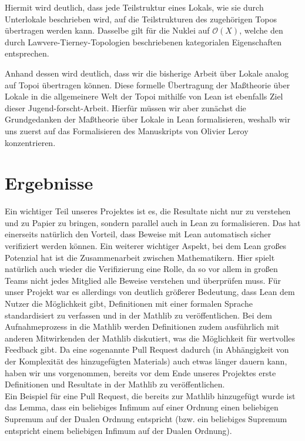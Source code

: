\documentclass{article}
\begin{document}
Hiermit wird deutlich, dass jede Teilstruktur eines Lokals, wie sie durch Unterlokale beschrieben wird, auf die Teilstrukturen des zugehörigen Topos übertragen werden kann. Dasselbe gilt für die Nuklei auf $\mathcal{O}(X)$, welche den durch Lawvere-Tierney-Topologien beschriebenen kategorialen Eigenschaften entsprechen.

Anhand dessen wird deutlich, dass wir die bisherige Arbeit über Lokale analog auf Topoi übertragen können. Diese formelle Übertragung der Maßtheorie über Lokale in die allgemeinere Welt der Topoi mithilfe von Lean ist ebenfalls Ziel dieser Jugend-forscht-Arbeit. Hierfür müssen wir aber zunächst die Grundgedanken der Maßtheorie über Lokale in Lean formalisieren, weshalb wir uns zuerst auf das Formalisieren des Manuskripts von Olivier Leroy konzentrieren.   

\section{Ergebnisse}
Ein wichtiger Teil unseres Projektes ist es, die Resultate nicht nur zu verstehen und zu Papier zu bringen, sondern parallel auch in Lean zu formalisieren. Das hat einerseits natürlich den Vorteil, dass Beweise mit Lean automatisch sicher verifiziert werden können. Ein weiterer wichtiger Aspekt, bei dem Lean großes Potenzial hat ist die Zusammenarbeit zwischen Mathematikern. Hier spielt natürlich auch wieder die Verifizierung eine Rolle, da so vor allem in großen Teams nicht jedes Mitglied alle Beweise verstehen und überprüfen muss. Für unser Projekt war es allerdings von deutlich größerer Bedeutung, dass Lean dem Nutzer die Möglichkeit gibt, Definitionen mit einer formalen Sprache standardisiert zu verfassen und in der Mathlib \autocite{noauthor_leanprover-communitymathlib4_2025} 
zu veröffentlichen. Bei dem Aufnahmeprozess in die Mathlib werden Definitionen zudem ausführlich mit anderen Mitwirkenden der Mathlib diskutiert, was die Möglichkeit für wertvolles Feedback gibt. Da eine sogenannte \glqq Pull Request \grqq{} \autocite{noauthor_how_nodate}
dadurch (in Abhängigkeit von der Komplexität des hinzugefügten Materials) auch etwas länger dauern kann, haben wir uns vorgenommen, bereits vor dem Ende unseres Projektes erste Definitionen und Resultate in der Mathlib zu veröffentlichen. \\
Ein Beispiel für eine Pull Request, die bereits zur Mathlib hinzugefügt wurde \autocite{noauthor_github_nodate} ist das Lemma, dass ein beliebiges Infimum auf einer Ordnung einen beliebigen Supremum auf der Dualen Ordnung entspricht (bzw. ein beliebiges Supremum entspricht einem beliebigen Infimum auf der Dualen Ordnung). \\ %
\end{document}
